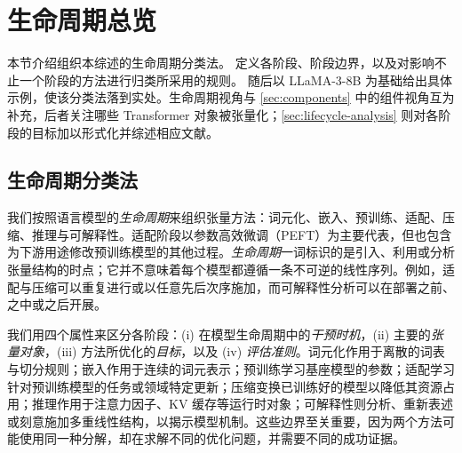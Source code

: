 \documentclass[11pt]{article}
\begin{document}
\section{生命周期总览}
\label{sec:lifecycle-overview}

本节介绍组织本综述的生命周期分类法。 定义各阶段、阶段边界，以及对影响不止一个阶段的方法进行归类所采用的规则。 随后以 LLaMA-3-8B 为基础给出具体示例，使该分类法落到实处。生命周期视角与 \cref{sec:components} 中的组件视角互为补充，后者关注哪些 Transformer 对象被张量化；\cref{sec:lifecycle-analysis} 则对各阶段的目标加以形式化并综述相应文献。

\subsection{生命周期分类法}
\label{subsec:taxonomy}

我们按照语言模型的\emph{生命周期}来组织张量方法：词元化、嵌入、预训练、适配、压缩、推理与可解释性。适配阶段以参数高效微调（PEFT）为主要代表，但也包含为下游用途修改预训练模型的其他过程。\emph{生命周期}一词标识的是引入、利用或分析张量结构的时点；它并不意味着每个模型都遵循一条不可逆的线性序列。例如，适配与压缩可以重复进行或以任意先后次序施加，而可解释性分析可以在部署之前、之中或之后开展。

我们用四个属性来区分各阶段：(i) 在模型生命周期中的\emph{干预时机}，(ii) 主要的\emph{张量对象}，(iii) 方法所优化的\emph{目标}，以及 (iv) \emph{评估准则}。词元化作用于离散的词表与切分规则；嵌入作用于连续的词元表示；预训练学习基座模型的参数；适配学习针对预训练模型的任务或领域特定更新；压缩变换已训练好的模型以降低其资源占用；推理作用于注意力因子、KV 缓存等运行时对象；可解释性则分析、重新表述或刻意施加多重线性结构，以揭示模型机制。这些边界至关重要，因为两个方法可能使用同一种分解，却在求解不同的优化问题，并需要不同的成功证据。
\end{document}
